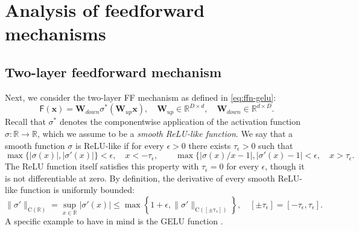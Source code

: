 \documentclass[namedate,webpdf,imanum]{ima-authoring-template}
\newcommand{\Real}{\mathbb{R}}
\newcommand{\Matrix}[1]{\mathbf{#1}}
\newcommand{\Norm}[3][]{#1\| #2 #1\|_{\mathrm{#3}}}
\newcommand{\Layer}[1]{\mathsf{#1}}
\numberwithin{equation}{section}
\begin{document}
\section{Analysis of feedforward mechanisms}
\label{sec:ffn}

\subsection{Two-layer feedforward mechanism}
Next, we consider the two-layer FF mechanism as defined in \eqref{eq:ffn-gelu}:
\begin{equation*}
    \Layer{F}(\Matrix{x}) = \Matrix{W}_{down} \sigma^\ast(\Matrix{W}_{up} \Matrix{x}), \quad \Matrix{W}_{up} \in \Real^{D \times d}, \quad \Matrix{W}_{down} \in \Real^{d \times D}.
\end{equation*}
Recall that $\sigma^\ast$ denotes the componentwise application of the activation function $\sigma : \Real \to \Real$, which we assume to be a \emph{smooth ReLU-like function}.
We say that a smooth function $\sigma$ is ReLU-like if for every $\epsilon > 0$ there exists $\tau_{\epsilon} > 0$ such that
\begin{equation*}
    \max\{|\sigma(x)|, |\sigma'(x)|\} < \epsilon, \quad x < -\tau_{\epsilon}, \qquad
    \max\{|\sigma(x) / x - 1|, |\sigma'(x) - 1| < \epsilon, \quad x > \tau_{\epsilon}.
\end{equation*}
The ReLU function itself satisfies this property with $\tau_{\epsilon} = 0$ for every $\epsilon$, though it is not differentiable at zero.
By definition, the derivative of every smooth ReLU-like function is uniformly bounded:
\begin{equation*}
    \Norm{\sigma'}{C(\Real)} = \sup_{x \in \Real} |\sigma'(x)| \leq \max\left\{ 1 + \epsilon, \Norm{\sigma'}{C([\pm \tau_{\epsilon}])} \right\}, \quad [\pm \tau_{\epsilon}] = [-\tau_\epsilon, \tau_\epsilon].
\end{equation*}
A specific example to have in mind is the GELU function \citep{hendrycks2016gaussian}.
\end{document}
